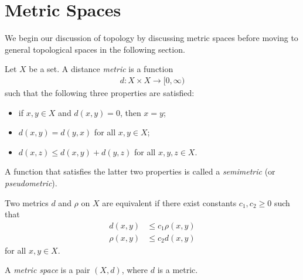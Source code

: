\section{Metric Spaces}%
We begin our discussion of topology by discussing metric spaces before moving to general topological spaces in the following section.
\begin{definition}[Metrics]\label{def:metrics_and_equivalent_metrics}
  Let $X$ be a set. A distance \textit{metric} is a function
  \begin{align*}
    d\colon X\times X\rightarrow [0,\infty)
  \end{align*}
  such that the following three properties are satisfied:
  \begin{itemize}
    \item if $x,y\in X$ and $d\left(x,y\right) = 0$, then $x = y$;
    \item $d\left(x,y\right) = d\left(y,x\right)$ for all $x,y\in X$;
    \item $d\left(x,z\right) \leq d\left(x,y\right) + d\left(y,z\right)$ for all $x,y,z\in X$.
  \end{itemize}
  A function that satisfies the latter two properties is called a \textit{semimetric} (or \textit{pseudometric}).\newline

  Two metrics $d$ and $\rho$ on $X$ are equivalent if there exist constants $c_1,c_2\geq 0$ such that
  \begin{align*}
    d\left(x,y\right) &\leq c_1 \rho\left(x,y\right)\\
    \rho\left(x,y\right) &\leq c_2 d\left(x,y\right)
  \end{align*}
  for all $x,y\in X$.\newline

  A \textit{metric space} is a pair $\left(X,d\right)$, where $d$ is a metric.
\end{definition}
